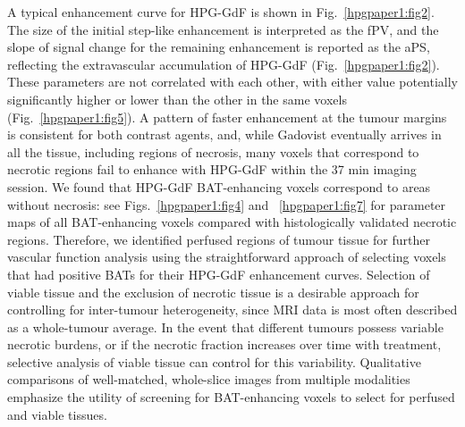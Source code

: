 A typical enhancement curve for \acs{HPG-GdF} is shown in Fig.~\ref{hpgpaper1:fig2}.
The size of the initial step-like enhancement is interpreted as the \acs{fPV}, and the slope of signal change for the remaining enhancement is reported as the \acs{aPS}, reflecting the extravascular accumulation of \acs{HPG-GdF} (Fig.~\ref{hpgpaper1:fig2}).
These parameters are not correlated with each other, with either value potentially significantly higher or lower than the other in the same voxels (Fig.~\ref{hpgpaper1:fig5}).
A pattern of faster enhancement at the tumour margins is consistent for both contrast agents, and, while Gadovist eventually arrives in all the tissue, including regions of necrosis, many voxels that correspond to necrotic regions fail to enhance with \acs{HPG-GdF} within the 37 min imaging session.
We found that \acs{HPG-GdF} \acs{BAT}-enhancing voxels correspond to areas without necrosis: see Figs.~\ref{hpgpaper1:fig4} and ~\ref{hpgpaper1:fig7} for parameter maps of all \acs{BAT}-enhancing voxels compared with histologically validated necrotic regions.
Therefore, we identified perfused regions of tumour tissue for further vascular function analysis using the straightforward approach of selecting voxels that had positive \acs{BAT}s for their \acs{HPG-GdF} enhancement curves.
Selection of viable tissue and the exclusion of necrotic tissue is a desirable approach for controlling for inter-tumour heterogeneity, since MRI data is most often described as a whole-tumour average.
In the event that different tumours possess variable necrotic burdens, or if the necrotic fraction increases over time with treatment, selective analysis of viable tissue can control for this variability.
Qualitative comparisons of well-matched, whole-slice images from multiple modalities emphasize the utility of screening for \acs{BAT}-enhancing voxels to select for perfused and viable tissues.

